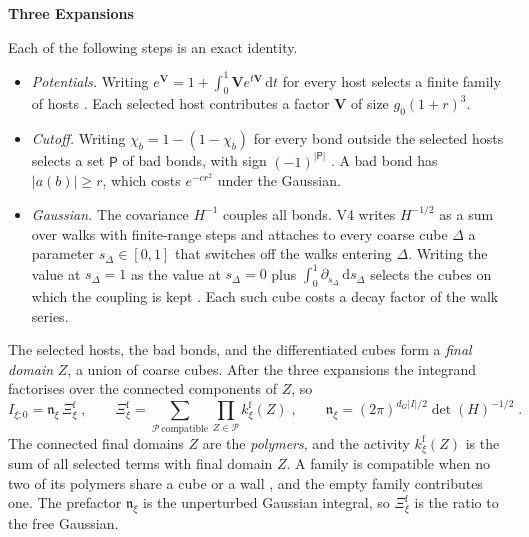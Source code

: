 \documentclass[11pt,a4paper]{article}
\newcommand{\dd}{\mathrm{d}}
\newcommand{\subhead}[1]{\par\vspace{4pt}\textbf{\color{ink}#1}\par}
\begin{document}
\subhead{Three Expansions}
Each of the following steps is an exact identity.
\begin{itemize}
    \item \emph{Potentials.} Writing $e^{\mathbf V}=1+\int_0^1\mathbf Ve^{t\mathbf V}\,\dd t$ for every host selects a finite family of hosts \cite[eq.~(2.1)]{BalabanRG2}. Each selected host contributes a factor $\mathbf V$ of size $g_0(1+r)^3$.
    \item \emph{Cutoff.} Writing $\chi_b=1-(1-\chi_b)$ for every bond outside the selected hosts selects a set $\mathsf P$ of bad bonds, with sign $(-1)^{|\mathsf P|}$ \cite[eq.~(2.3)]{BalabanRG2}. A bad bond has $|a(b)|\geqslant r$, which costs $e^{-cr^2}$ under the Gaussian.
    \item \emph{Gaussian.} The covariance $H^{-1}$ couples all bonds. V4 writes $H^{-1/2}$ as a sum over walks with finite-range steps and attaches to every coarse cube $\Delta$ a parameter $s_\Delta\in[0,1]$ that switches off the walks entering $\Delta$. Writing the value at $s_\Delta=1$ as the value at $s_\Delta=0$ plus $\int_0^1\partial_{s_\Delta}\,\dd s_\Delta$ selects the cubes on which the coupling is kept \cite[eq.~(2.8)]{BalabanRG2}. Each such cube costs a decay factor of the walk series.
\end{itemize}
The selected hosts, the bad bonds, and the differentiated cubes form a \emph{final domain} $Z$, a union of coarse cubes. After the three expansions the integrand factorises over the connected components of $Z$, so
\begin{equation*}
    I_{\xi;0}=\mathfrak n_\xi\,\Xi^{\mathrm f}_\xi\;,\qquad \Xi^{\mathrm f}_\xi=\sum_{\mathcal P\,\mathrm{compatible}}\prod_{Z\in\mathcal P}k^{\mathrm f}_\xi(Z)\;,\qquad \mathfrak n_\xi=(2\pi)^{d_G|I|/2}\det(H)^{-1/2}\;.
\end{equation*}
The connected final domains $Z$ are the \emph{polymers}, and the activity $k^{\mathrm f}_\xi(Z)$ is the sum of all selected terms with final domain $Z$. A family is compatible when no two of its polymers share a cube or a wall \cite[eq.~(2.11)]{BalabanRG2}, and the empty family contributes one. The prefactor $\mathfrak n_\xi$ is the unperturbed Gaussian integral, so $\Xi^{\mathrm f}_\xi$ is the ratio to the free Gaussian.
\end{document}
